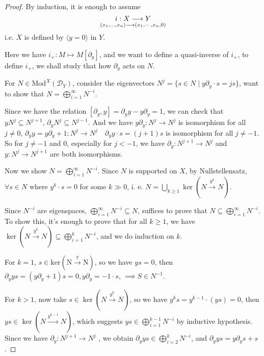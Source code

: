 \documentclass[openany]{book}
\theoremstyle{definition} %
\theoremstyle{remark}
\begin{document}
\begin{proof}
    \quad

    By induction, it is enough to assume $$i: X \longrightarrow Y\atop (x_{1},\dots,x_{n}) \longrightarrow (x_{1},\cdots,x_{n},0)$$i.e. $X$ is defined by $\langle y = 0 \rangle$ in $Y$.

    Here we have $i_{+}: M\mapsto M[\partial_{y}]$, and we want to define a quasi-inverse of $i_{+}$, to define $i_{+}$, we shall study that how $\partial_{y}$ acts on $N$.

    For $N \in \mathrm{Mod}^{X}(\mathcal{D}_{Y})$, consider the eigenvectors $N^{j} = \{ s \in N \mid y\partial_{y} \cdot s = j s \}$, want to show that $N=\bigoplus\limits_{i=1}^{\infty}N^{-i}$.

    Since we have the relation $[\partial_{y}, y] = \partial_{y}y -  y\partial_{y} = 1$, we can check that $y N^{j} \subseteq N^{j+1}$, $\partial_{y} N^{j} \subseteq N^{j-1}$. And we have $y\partial_{y}: N^{j}\rightarrow N^{j}$ is isomorphism for all $j \neq 0$,  $\partial_{y}y = y\partial_{y} + 1: N^{j}\rightarrow N^{j}\quad\partial_{y}y\cdot s=(j+1)s$ is isomorphism for all $j \neq -1$. So for $j\neq -1$ and $0$, especially for $j<-1$, we have $\partial_{y}:N^{j+1}\rightarrow N^{j}$ and $y:N^{j}\rightarrow N^{j+1}$ are both isomorphisms.

    Now we show $N=\bigoplus\limits_{i=1}^{\infty}N^{-i}$.
    Since $N$ is supported on $X$, by Nullstellensatz, $\forall s\in N$ where $y^{k}\cdot s = 0$ for some $k\gg0$, i. e. $N = \bigcup\limits_{k\geq1} \ker(N\xrightarrow{y^{k}} N)$.

    Since $N^{-i}$ are eigenspaces, $\bigoplus\limits_{i=1}^{\infty }N^{-i}\subseteq N$, suffices to prove that $N\subseteq \bigoplus\limits_{i=1}^{\infty }N^{-i}$. To show this, it's enough to prove that for all $k\ge 1$, we have $\ker(N\xrightarrow{y^{k}} N)\subseteq\bigoplus\limits_{i=1}^{k}N^{-i}$, and we do induction on $k$.

    For $k=1$, $s\in \mathrm{ker(N\xrightarrow{y}N)}$, so we have $ys=0$, then $\partial_{y}ys=(y\partial_{y}+1)s=0,y\partial_{y}=-1\cdot s$, $\implies S\in N^{-1}$.

    For $k>1$, now take $s\in \ker(N \xrightarrow{y^{k}}N)$, so we have $y^{k}s=y^{k-1} \cdot(ys)=0$, then $ys \in \ker(N \xrightarrow{y^{k-1}}N)$, which suggests $ys \in \bigoplus\limits_{i=1}^{k-1} N^{-i}$ by inductive hypothesis.
    Since we have $\partial_{y}: N^{j+1}\rightarrow N^{j}$ , we obtain $\partial_{y}ys \in \bigoplus\limits_{i=2}^{k} N^{-i}$, and $\partial_{y}ys=y\partial_{y}s+s$.


\end{proof}
\end{document}

